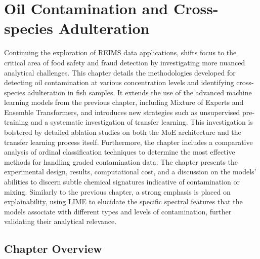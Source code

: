 \chapter{Oil Contamination and Cross-species Adulteration}
\label{chapter:oil-contamination-and-cross-species-adulteration}

Continuing the exploration of REIMS data applications,  shifts focus to the critical area of food safety and fraud detection by investigating more nuanced analytical challenges. This chapter details the methodologies developed for detecting oil contamination at various concentration levels and identifying cross-species adulteration in fish samples. It extends the use of the advanced machine learning models from the previous chapter, including Mixture of Experts and Ensemble Transformers, and introduces new strategies such as unsupervised pre-training and a systematic investigation of transfer learning. This investigation is bolstered by detailed ablation studies on both the MoE architecture and the transfer learning process itself. Furthermore, the chapter includes a comparative analysis of ordinal classification techniques to determine the most effective methods for handling graded contamination data. The chapter presents the experimental design, results, computational cost, and a discussion on the models' abilities to discern subtle chemical signatures indicative of contamination or mixing. Similarly to the previous chapter, a strong emphasis is placed on explainability, using LIME to elucidate the specific spectral features that the models associate with different types and levels of contamination, further validating their analytical relevance.

\section{Chapter Overview}


